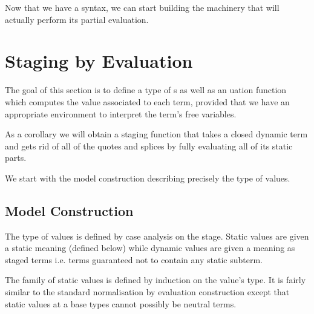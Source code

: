 \documentclass{article}
\begin{document}
\noindent
\begin{minipage}{.4\textwidth}
\end{minipage}\hfill
\begin{minipage}{.5\textwidth}
\end{minipage}

Now that we have a syntax, we can start building the machinery
that will actually perform its partial evaluation.

\section{Staging by Evaluation}

The goal of this section is to define a type of s
as well as an uation function which computes the
value associated to each term, provided that we have an
appropriate environment to interpret the term's free variables.


As a corollary we will obtain a staging function
that takes a closed dynamic term and gets rid of all of
the quotes and splices by fully
evaluating all of its static parts.


We start with the model construction describing precisely
the type of values.

\subsection{Model Construction}\label{sec:stagingmodel}

The type of values is defined by case analysis on the stage.
%
Static values are given a static meaning (defined below)
while dynamic values are given a meaning as staged terms
i.e. terms guaranteed not to contain any static subterm.


The family of static values is defined by induction on
the value's type. It is fairly similar to the standard
normalisation by evaluation construction
except that static values at a base types cannot possibly
be neutral terms.

\begin{AgdaSuppressSpace}
\end{AgdaSuppressSpace}
\end{document}
